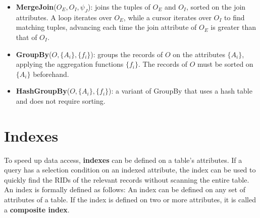 \begin{itemize}
    \item \textbf{MergeJoin}($O_E, O_I, \psi_J$): joins the tuples of $O_E$ and $O_I$, sorted on the join attributes. A loop iterates over $O_E$, while a cursor iterates over $O_I$ to find matching tuples, advancing each time the join attribute of $O_E$ is greater than that of $O_I$.
    \item \textbf{GroupBy}($O, \{A_i\}, \{f_i\}$): groups the records of $O$ on the attributes $\{A_i\}$, applying the aggregation functions $\{f_i\}$. The records of $O$ must be sorted on $\{A_i\}$ beforehand.
    \item \textbf{HashGroupBy}($O, \{A_i\}, \{f_i\}$): a variant of GroupBy that uses a hash table and does not require sorting.
\end{itemize}

\section{Indexes}

To speed up data access, \textbf{indexes} can be defined on a table's attributes. If a query has a selection condition on an indexed attribute, the index can be used to quickly find the RIDs of the relevant records without scanning the entire table. An index is formally defined as follows:
An index can be defined on any set of attributes of a table. If the index is defined on two or more attributes, it is called a \textbf{composite index}.

